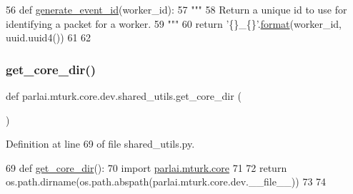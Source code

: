 \begin{DoxyCode}
56 \textcolor{keyword}{def }\hyperlink{namespaceparlai_1_1mturk_1_1core_1_1shared__utils_aba2e4d48063dafc80e931f8925dbb755}{generate\_event\_id}(worker\_id):
57     \textcolor{stringliteral}{"""}
58 \textcolor{stringliteral}{    Return a unique id to use for identifying a packet for a worker.}
59 \textcolor{stringliteral}{    """}
60     \textcolor{keywordflow}{return} \textcolor{stringliteral}{'\{\}\_\{\}'}.\hyperlink{namespaceparlai_1_1mturk_1_1core_1_1shared__utils_afcac728e96b38bbad8cde6f7be4f613e}{format}(worker\_id, uuid.uuid4())
61 
62 
\end{DoxyCode}
\mbox{\label{namespaceparlai_1_1mturk_1_1core_1_1dev_1_1shared__utils_aead9ab64df5040f7a479ea81deea353c}} 
\subsubsection{\texorpdfstring{get\+\_\+core\+\_\+dir()}{get\_core\_dir()}}
{\footnotesize\ttfamily def parlai.\+mturk.\+core.\+dev.\+shared\+\_\+utils.\+get\+\_\+core\+\_\+dir (\begin{DoxyParamCaption}{ }\end{DoxyParamCaption})}



Definition at line 69 of file shared\+\_\+utils.\+py.


\begin{DoxyCode}
69 \textcolor{keyword}{def }\hyperlink{namespaceparlai_1_1mturk_1_1core_1_1shared__utils_ac4e340ccc66c691fdd294c734dae0c5d}{get\_core\_dir}():
70     \textcolor{keyword}{import} \hyperlink{namespaceparlai_1_1mturk_1_1core}{parlai.mturk.core}
71 
72     \textcolor{keywordflow}{return} os.path.dirname(os.path.abspath(parlai.mturk.core.dev.\_\_file\_\_))
73 
74 
\end{DoxyCode}
\mbox{\label{namespaceparlai_1_1mturk_1_1core_1_1dev_1_1shared__utils_a1a7ab908ecffbfc1fabb5222625d35a2}} 

